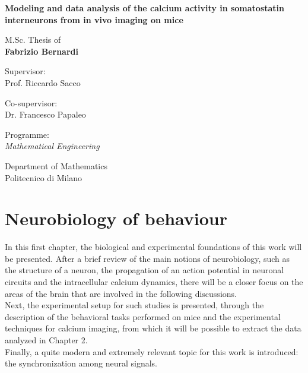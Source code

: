 \documentclass[a4paper]{article}
\newcommand{\myName}{Fabrizio Bernardi}
\newcommand{\myTitle}{Modeling and data analysis of the calcium activity in somatostatin interneurons from in vivo imaging on mice }
\newcommand{\myDegree}{Programme: \protect\\ \textit{Mathematical Engineering}}
\newcommand{\myDepartment}{Department of Mathematics}
\newcommand{\myUni}{Politecnico di Milano}
\begin{document}
\begin{titlepage}
\begin{minipage}{\linewidth}
\begin{minipage}{0.45\linewidth}
\begin{figure}[H]
				\end{figure}
			\end{minipage}
		\end{minipage}
		
		\begin{addmargin}[1cm]{-1cm}
			\setlength{\parindent}{0pt}
			\vfill
			
			{\huge\bfseries\myTitle}
			
			\vspace{2cm}
			
			{\Large M.Sc. Thesis of\\[0.125cm]}
			{\LARGE\bfseries\myName}
			
			\vspace{1cm}
			
			\large
			Supervisor:\\[0.125cm]
			{\Large Prof. Riccardo Sacco}
			
			\vspace{0.5cm}
			
			\large
			Co-supervisor:\\[0.125cm]
			{\Large Dr. Francesco Papaleo}
			
			\vspace{2cm}
			
			\myDegree
			
			\vspace{0.5cm}
			
			\myDepartment \\
			\myUni
			
			\vfill
		\end{addmargin}
	\end{titlepage}
	
	\tableofcontents
	
	\newpage
	
	\section{Neurobiology of behaviour}
	
	
	In this first chapter, the biological and experimental foundations of this work will be presented. After a brief review of the main notions of neurobiology, such as the structure of a neuron, the propagation of an action potential in neuronal circuits and the intracellular calcium dynamics, there will be a closer focus on the areas of the brain that are involved in the following discussions.\\
	Next, the experimental setup for such studies is presented, through the description of the behavioral tasks performed on mice and the experimental techniques for calcium imaging, from which it will be possible to extract the data analyzed in Chapter 2.\\
	Finally, a  quite modern and extremely relevant topic for this work is introduced: the synchronization among neural signals.
	
\end{document}
